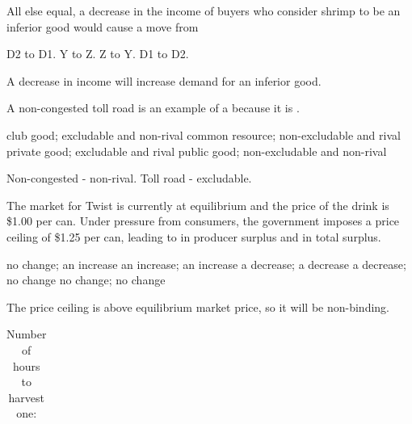 \documentclass[addpoints,11pt]{exam}
\theoremstyle{definition}
\newcommand{\blank}[0]{\underline{\hspace{3cm}}}
\begin{document}
\begin{questions}
	All else equal, a decrease in the income of buyers who consider shrimp to be an inferior good would cause a move from
	
	\begin{choices}
		\CorrectChoice D2 to D1.
		\choice Y to Z.
		\choice Z to Y.
		\choice D1 to D2.
	\end{choices}
	
	\begin{solution}
		A decrease in income will increase demand for an inferior good.
	\end{solution}
	
	
	\question A non-congested toll road is an example of a \blank because it is \blank.
	
	\begin{choices}
		\CorrectChoice club good; excludable and non-rival
		\choice common resource; non-excludable and rival
		\choice private good; excludable and rival
		\choice public good; non-excludable and non-rival
	\end{choices}
	
	\begin{solution}
		Non-congested - non-rival. Toll road - excludable.
	\end{solution}
	

	\question The market for Twist is currently at equilibrium and the price of the drink is \$1.00 per can. Under pressure from consumers, the government imposes a price ceiling of \$1.25 per can, leading to \blank in producer surplus and \blank in total surplus.
	
	\begin{choices}
		\choice no change; an increase
		\choice an increase; an increase
		\choice a decrease; a decrease
		\choice a decrease; no change
		\CorrectChoice no change; no change
	\end{choices}
	
	\begin{solution}
		The price ceiling is above equilibrium market price, so it will be non-binding.
	\end{solution}


\newpage
	
	
\begin{table}[H]
	\caption{Number of hours to harvest one:}
	\centering
	\begin{tabular}{ c|c|c} 
		

\end{tabular}
\end{table}
\end{questions}
\end{document}
